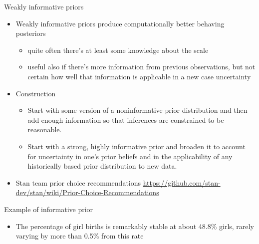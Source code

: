 \documentclass[english,t]{beamer}
\begin{document}
\begin{frame}
{Weakly informative priors}

  \begin{itemize}
  \item Weakly informative priors produce computationally better
    behaving posteriors
    \begin{itemize}
    \item quite often there's at least some knowledge about the
      scale
    \item useful also if there's more information from previous
      observations, but not certain how well that information is
      applicable in a new case uncertainty
    \end{itemize}
    \pause
    \item Construction
      \begin{itemize}
      \item Start with some version of a noninformative prior distribution and then add enough
        information so that inferences are constrained to be reasonable.
      \item Start with a strong, highly informative prior and broaden it to account for uncertainty
        in one's prior beliefs and in the applicability of any historically based prior distribution
        to new data.
      \end{itemize}
    \item Stan team prior choice recommendations \url{https://github.com/stan-dev/stan/wiki/Prior-Choice-Recommendations}
  \end{itemize}

\end{frame}

\begin{frame}
{Example of informative prior}
  
  \begin{itemize}
  \item The percentage of girl births is remarkably stable at about
    48.8\% girls, rarely varying by more than 0.5\% from this rate
  \end{itemize}
  \begin{center}
  \end{center}
\end{frame}
\end{document}
